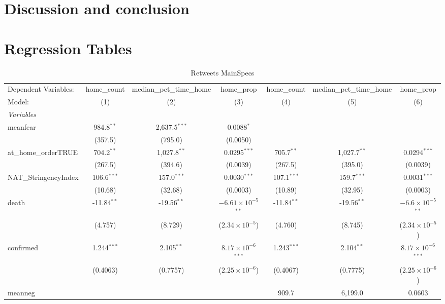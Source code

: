 \documentclass{article}
\begin{document}
\section{Discussion and conclusion} %


\printbibliography
\newpage

\appendix 
\section{Regression Tables}
\begin{landscape}
  

\begin{table}
\centering
\caption{Retweets MainSpecs}
\begin{tabular}{lcccccc}
  \tabularnewline\midrule\midrule
  Dependent Variables:&home\_count&median\_pct\_time\_home&home\_prop&home\_count&median\_pct\_time\_home&home\_prop\\
  Model:&(1) & (2) & (3) & (4) & (5) & (6)\\
  \midrule \emph{Variables}&   &   &   &   &   &  \\
  meanfear&984.8$^{**}$ & 2,637.5$^{***}$ & 0.0088$^{*}$ &    &    &   \\
    &(357.5) & (795.0) & (0.0050) &    &    &   \\
  at\_home\_orderTRUE&704.2$^{**}$ & 1,027.8$^{**}$ & 0.0295$^{***}$ & 705.7$^{**}$ & 1,027.7$^{**}$ & 0.0294$^{***}$\\
    &(267.5) & (394.6) & (0.0039) & (267.5) & (395.0) & (0.0039)\\
  NAT\_StringencyIndex&106.6$^{***}$ & 157.0$^{***}$ & 0.0030$^{***}$ & 107.1$^{***}$ & 159.7$^{***}$ & 0.0031$^{***}$\\
    &(10.68) & (32.68) & (0.0003) & (10.89) & (32.95) & (0.0003)\\
  death&-11.84$^{**}$ & -19.56$^{**}$ & $-6.61\times 10^{-5}$$^{**}$ & -11.84$^{**}$ & -19.56$^{**}$ & $-6.6\times 10^{-5}$$^{**}$\\
    &(4.757) & (8.729) & ($2.34\times 10^{-5}$) & (4.760) & (8.745) & ($2.34\times 10^{-5}$)\\
  confirmed&1.244$^{***}$ & 2.105$^{**}$ & $8.17\times 10^{-6}$$^{***}$ & 1.243$^{***}$ & 2.104$^{**}$ & $8.17\times 10^{-6}$$^{***}$\\
    &(0.4063) & (0.7757) & ($2.25\times 10^{-6}$) & (0.4067) & (0.7775) & ($2.25\times 10^{-6}$)\\
  meanneg&   &    &    & 909.7 & 6,199.0 & 0.0603\\

\end{tabular}
\end{table}
\end{landscape}
\end{document}
